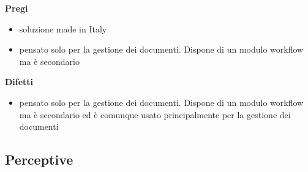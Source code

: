 \textbf{Pregi}
	\begin{itemize}
	\item soluzione made in Italy
	\item pensato solo per la gestione dei documenti. Dispone di un modulo workflow ma è secondario
	
	\end{itemize}

\textbf{Difetti}
	\begin{itemize}
	\item pensato solo per la gestione dei documenti. Dispone di un modulo workflow ma è secondario ed è comunque usato principalmente per la gestione dei documenti
	
	
	
	\end{itemize}


	\subsection{Perceptive}


